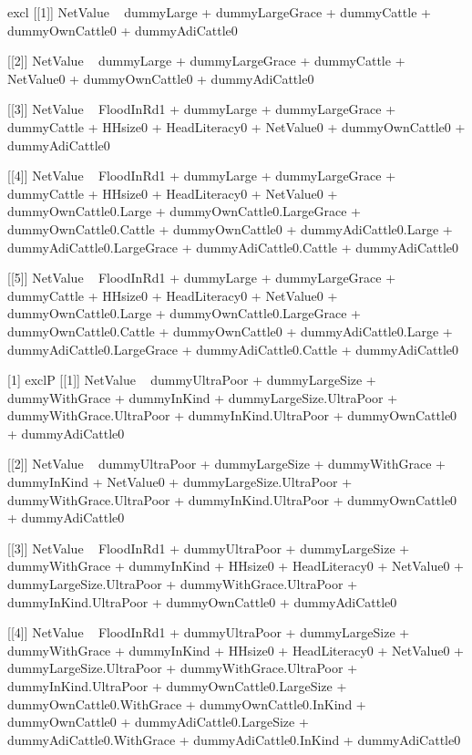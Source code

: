 \begin{Schunk}
\begin{Soutput}
[1] excl
[[1]]
NetValue ~ dummyLarge + dummyLargeGrace + dummyCattle + dummyOwnCattle0 + 
    dummyAdiCattle0

[[2]]
NetValue ~ dummyLarge + dummyLargeGrace + dummyCattle + NetValue0 + 
    dummyOwnCattle0 + dummyAdiCattle0

[[3]]
NetValue ~ FloodInRd1 + dummyLarge + dummyLargeGrace + dummyCattle + 
    HHsize0 + HeadLiteracy0 + NetValue0 + dummyOwnCattle0 + dummyAdiCattle0

[[4]]
NetValue ~ FloodInRd1 + dummyLarge + dummyLargeGrace + dummyCattle + 
    HHsize0 + HeadLiteracy0 + NetValue0 + dummyOwnCattle0.Large + 
    dummyOwnCattle0.LargeGrace + dummyOwnCattle0.Cattle + dummyOwnCattle0 + 
    dummyAdiCattle0.Large + dummyAdiCattle0.LargeGrace + dummyAdiCattle0.Cattle + 
    dummyAdiCattle0

[[5]]
NetValue ~ FloodInRd1 + dummyLarge + dummyLargeGrace + dummyCattle + 
    HHsize0 + HeadLiteracy0 + NetValue0 + dummyOwnCattle0.Large + 
    dummyOwnCattle0.LargeGrace + dummyOwnCattle0.Cattle + dummyOwnCattle0 + 
    dummyAdiCattle0.Large + dummyAdiCattle0.LargeGrace + dummyAdiCattle0.Cattle + 
    dummyAdiCattle0

[1] exclP
[[1]]
NetValue ~ dummyUltraPoor + dummyLargeSize + dummyWithGrace + 
    dummyInKind + dummyLargeSize.UltraPoor + dummyWithGrace.UltraPoor + 
    dummyInKind.UltraPoor + dummyOwnCattle0 + dummyAdiCattle0

[[2]]
NetValue ~ dummyUltraPoor + dummyLargeSize + dummyWithGrace + 
    dummyInKind + NetValue0 + dummyLargeSize.UltraPoor + dummyWithGrace.UltraPoor + 
    dummyInKind.UltraPoor + dummyOwnCattle0 + dummyAdiCattle0

[[3]]
NetValue ~ FloodInRd1 + dummyUltraPoor + dummyLargeSize + dummyWithGrace + 
    dummyInKind + HHsize0 + HeadLiteracy0 + NetValue0 + dummyLargeSize.UltraPoor + 
    dummyWithGrace.UltraPoor + dummyInKind.UltraPoor + dummyOwnCattle0 + 
    dummyAdiCattle0

[[4]]
NetValue ~ FloodInRd1 + dummyUltraPoor + dummyLargeSize + dummyWithGrace + 
    dummyInKind + HHsize0 + HeadLiteracy0 + NetValue0 + dummyLargeSize.UltraPoor + 
    dummyWithGrace.UltraPoor + dummyInKind.UltraPoor + dummyOwnCattle0.LargeSize + 
    dummyOwnCattle0.WithGrace + dummyOwnCattle0.InKind + dummyOwnCattle0 + 
    dummyAdiCattle0.LargeSize + dummyAdiCattle0.WithGrace + dummyAdiCattle0.InKind + 
    dummyAdiCattle0


\end{Soutput}
\end{Schunk}
